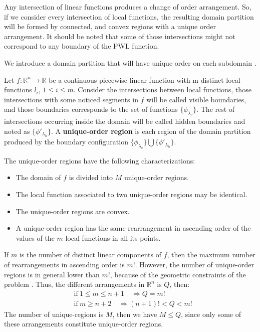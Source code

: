 Any intersection of linear functions produces a change of order arrangement. So, if we consider every intersection of local functions, the resulting domain partition will be formed by connected, and convex regions with a unique order arrangement. It should be noted that some of those intersections might not correspond to any boundary of the PWL function.  

We introduce a domain partition that will have unique order on each subdomain \cite{tarela1999region}.
\begin{definition}
	Let $f:\mathbb{R}^n\to\mathbb{R}$ be a continuous piecewise linear function with m distinct local functions $l_i$, $1\le i\le m$. Consider the intersections between local functions, those intersections with some noticed segments in $f$ will be called visible boundaries, and those boundaries corresponds to the set of functions $\{\phi_{\lambda_v}\}$. The rest of intersections occurring inside the domain will be called hidden boundaries and noted as $\{\phi'_{\lambda_h}\}$. A \textbf{unique-order region} is each region of the domain partition produced by the boundary configuration $\{\phi_{\lambda_v}\}\bigcup\{\phi'_{\lambda_h}\}$.
\end{definition}

\bigskip
The unique-order regions have the following characterizations:
\begin{itemize}
	\item The domain of $f$ is divided into $M$ unique-order regions.
	\item The local function associated to two unique-order regions may be identical.
	\item The unique-order regions are convex.
	\item A unique-order region has the same rearrangement in ascending order of the values of the $m$ local functions in all its points.
\end{itemize}

\begin{remark}
	If $m$ is the number of distinct linear components of $f$, then the maximum number of rearrangements in ascending order is $m!$. However, the number of unique-order regions is in general lower than $m!$, because of the geometric constraints of the problem \cite{wilkinson1963method}. Thus, the different arrangements in $\mathbb{R}^n$ is $Q$, then:
	\begin{equation*}
	\begin{aligned}
	&\mathrm{if}\ 1\le m\le n+1\quad\Rightarrow Q=m!\\
	&\mathrm{if}\ m\ge n+2\quad\Rightarrow (n+1)!<Q<m!
	\end{aligned}
	\end{equation*}
	The number of unique-regions is $M$, then we have $M\le Q$, since only some of these arrangements constitute unique-order regions.
\end{remark}




